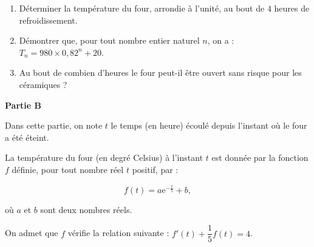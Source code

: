\documentclass[10pt]{article}
\begin{document}
\medskip

\begin{enumerate}
\item Déterminer la température du four, arrondie à l'unité, au bout de $4$ heures de
refroidissement.
\item  Démontrer que, pour tout nombre entier naturel $n$, on a : $T_n = 980 \times 0,82^n + 20$.
\item  Au bout de combien d'heures le four peut-il être ouvert sans risque pour les céramiques ?
 \end{enumerate}
 
\bigskip

\textbf{Partie B}

\medskip

Dans cette partie, on note $t$ le temps (en heure) écoulé depuis l'instant où le four a été éteint.

La température du four (en degré Celsius) à l'instant $t$ est donnée par la fonction $f$ définie,
pour tout nombre réel $t$ positif, par : 

\[f(t) = a\text{e}^{- \frac{t}{5}} + b,\]

où $a$ et $b$ sont deux nombres réels.

On admet que $f$ vérifie la relation suivante : $f'(t) + \dfrac{1}{5}f(t) = 4$.
\medskip
\end{document}
